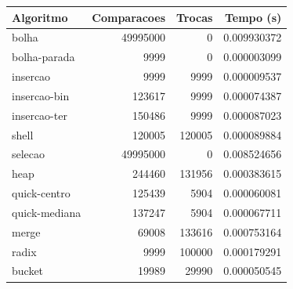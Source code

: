 \begin{tabular}{lrrr}
\hline
Algoritmo & Comparacoes & Trocas & Tempo (s) \\
\hline
bolha & 49995000 & 0 & 0.009930372 \\
bolha-parada & 9999 & 0 & 0.000003099 \\
insercao & 9999 & 9999 & 0.000009537 \\
insercao-bin & 123617 & 9999 & 0.000074387 \\
insercao-ter & 150486 & 9999 & 0.000087023 \\
shell & 120005 & 120005 & 0.000089884 \\
selecao & 49995000 & 0 & 0.008524656 \\
heap & 244460 & 131956 & 0.000383615 \\
quick-centro & 125439 & 5904 & 0.000060081 \\
quick-mediana & 137247 & 5904 & 0.000067711 \\
merge & 69008 & 133616 & 0.000753164 \\
radix & 9999 & 100000 & 0.000179291 \\
bucket & 19989 & 29990 & 0.000050545 \\
\hline
\end{tabular}
